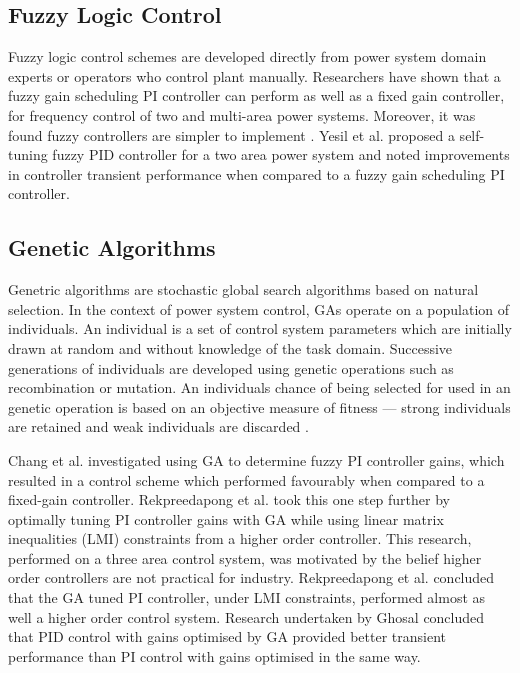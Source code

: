 \subsection{Fuzzy Logic Control}
Fuzzy logic control schemes are developed directly from power system domain experts or operators who control plant manually. Researchers have shown that a fuzzy gain scheduling PI controller can perform as well as a fixed gain controller, for frequency control of two and multi-area power systems. Moreover, it was found fuzzy controllers are simpler to implement \cite{Chang1997, Cam2005}. Yesil et al. \cite{Yesil2004} proposed a self-tuning fuzzy PID controller for a two area power system and noted improvements in controller transient performance when compared to a fuzzy gain scheduling PI controller.

\subsection{Genetic Algorithms}
Genetric algorithms are stochastic global search algorithms based on natural selection. In the context of power system control, GAs operate on a population of individuals. An individual is a set of control system parameters which are initially drawn at random and without knowledge of the task domain. Successive generations of individuals are developed using genetic operations such as recombination or mutation. An individuals chance of being selected for used in an genetic operation is based on an objective measure of fitness --- strong individuals are retained and weak individuals are discarded \cite{Fleming1993}.

Chang et al. \cite{Chang1998} investigated using GA to determine fuzzy PI controller gains, which resulted in a control scheme which performed favourably when compared to a fixed-gain controller. Rekpreedapong et al. \cite{Rerkpreedapong2003} took this one step further by optimally tuning PI controller gains with GA while using linear matrix inequalities (LMI) constraints from a higher order controller. This research, performed on a three area control system, was motivated by the belief higher order controllers are not practical for industry. Rekpreedapong et al. concluded that the GA tuned PI controller, under LMI constraints, performed almost as well a higher order control system. Research undertaken by Ghosal \cite{Ghoshal2004} concluded that PID control with gains optimised by GA provided better transient performance than PI control with gains optimised in the same way.

